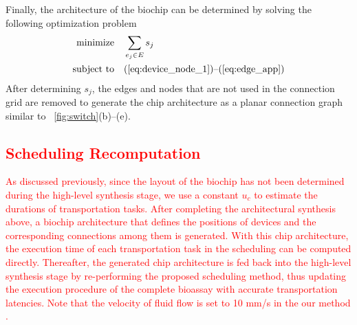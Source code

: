 Finally, the architecture of the biochip can be determined by solving the
following optimization problem
\begin{align} \label{eq:edge_opt}
\text{minimize} & \quad \sum_{e_j\in E}s_j\\
\text{subject to} & \quad
\text{(\ref{eq:device_node_1})--(\ref{eq:edge_app})}\label{eq:edge_opt_cond}
\end{align}
After determining $s_j$, the edges and nodes
that are not used in the connection grid
are removed to generate the chip architecture as a planar
connection graph similar to
\figname~\ref{fig:switch}(b)--(e).




\subsection{\textcolor{red}{Scheduling Recomputation}}\label{sec:schedual_recomputation}
\textcolor{red}{
As discussed previously, since the layout of the biochip has not been determined during the high-level synthesis stage, we use a constant $u_c$ to estimate the durations of transportation tasks. After completing the architectural synthesis above, a biochip architecture that defines the  positions of devices and the corresponding connections among them is generated. With this chip architecture, the execution time of each transportation task in the scheduling can be computed directly. Thereafter, the generated chip architecture is fed back into the high-level synthesis stage by re-performing the proposed scheduling method, thus updating the execution procedure of the complete bioassay with accurate transportation latencies. Note that the velocity of fluid flow is set to 10 mm/s in the our method \cite{minhass2012architectural}.
}










